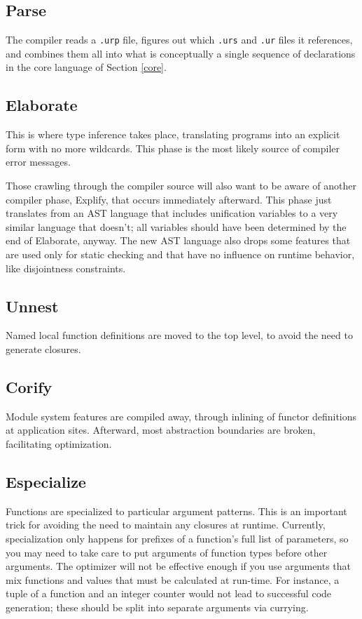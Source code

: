 \documentclass{article}
\begin{document}
\subsection{Parse}

The compiler reads a \texttt{.urp} file, figures out which \texttt{.urs} and \texttt{.ur} files it references, and combines them all into what is conceptually a single sequence of declarations in the core language of Section \ref{core}.

\subsection{Elaborate}

This is where type inference takes place, translating programs into an explicit form with no more wildcards.  This phase is the most likely source of compiler error messages.

Those crawling through the compiler source will also want to be aware of another compiler phase, Explify, that occurs immediately afterward.  This phase just translates from an AST language that includes unification variables to a very similar language that doesn't; all variables should have been determined by the end of Elaborate, anyway.  The new AST language also drops some features that are used only for static checking and that have no influence on runtime behavior, like disjointness constraints.

\subsection{Unnest}

Named local function definitions are moved to the top level, to avoid the need to generate closures.

\subsection{Corify}

Module system features are compiled away, through inlining of functor definitions at application sites.  Afterward, most abstraction boundaries are broken, facilitating optimization.

\subsection{Especialize}

Functions are specialized to particular argument patterns.  This is an important trick for avoiding the need to maintain any closures at runtime.  Currently, specialization only happens for prefixes of a function's full list of parameters, so you may need to take care to put arguments of function types before other arguments.  The optimizer will not be effective enough if you use arguments that mix functions and values that must be calculated at run-time.  For instance, a tuple of a function and an integer counter would not lead to successful code generation; these should be split into separate arguments via currying.
\end{document}
